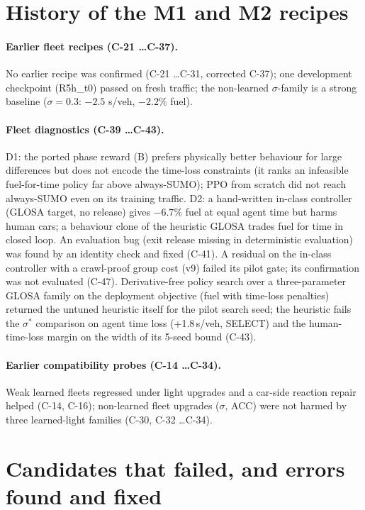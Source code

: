 \documentclass[11pt]{article}
\begin{document}
\appendix
\section{History of the M1 and M2 recipes}
\paragraph{Earlier fleet recipes (C-21 \dots C-37).} No earlier recipe was confirmed (C-21 \dots C-31, corrected C-37); one development checkpoint (R5h\_t0)
passed on fresh traffic; the non-learned $\sigma$-family is a strong baseline ($\sigma=0.3$: $-2.5$ s/veh, $-2.2\%$ fuel).
\paragraph{Fleet diagnostics (C-39 \dots C-43).} D1: the ported phase reward (B) prefers physically better behaviour for large
differences but does not encode the time-loss constraints (it ranks an infeasible fuel-for-time policy far above always-SUMO); PPO from
scratch did not reach always-SUMO even on its training traffic. D2: a hand-written in-class controller (GLOSA target, no release) gives
$-6.7\%$ fuel at equal agent time but harms human cars; a behaviour clone of the heuristic GLOSA trades fuel for time in closed loop.
An evaluation bug (exit release missing in deterministic evaluation) was found by an identity check and fixed (C-41).
A residual on the in-class controller with a crawl-proof group cost (v9) failed its pilot gate; its confirmation was not evaluated (C-47).
Derivative-free policy search over a three-parameter GLOSA family on the deployment objective (fuel with time-loss penalties) returned
the untuned heuristic itself for the pilot search seed; the heuristic fails the $\sigma^*$ comparison on agent time loss (+1.8\,s/veh,
SELECT) and the human-time-loss margin on the width of its 5-seed bound (C-43).
\paragraph{Earlier compatibility probes (C-14 \dots C-34).} Weak learned fleets regressed under light upgrades and a car-side reaction repair
helped (C-14, C-16); non-learned fleet upgrades ($\sigma$, ACC) were not harmed by three learned-light families (C-30, C-32 \dots C-34).

\section{Candidates that failed, and errors found and fixed}
\end{document}
